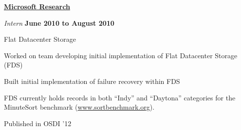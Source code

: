 \bigskip

\href{http://research.microsoft.com}{\textbf{Microsoft Research}}
\begin{outerlist}

\item[] \textit{Intern}
    \hfill \textbf{June 2010 to August 2010}
    \begin{innerlist}
        \item Flat Datacenter Storage
        \begin{innerlist}
           \item Worked on team developing initial implementation of Flat
Datacenter Storage (FDS)
           \item Built initial implementation of failure recovery within
FDS
           \item FDS currently holds records in both ``Indy'' and
``Daytona'' categories for the MinuteSort benchmark
(\href{http://www.sortbenchmark.org}{www.sortbenchmark.org}).
           \item Published in OSDI '12
        \end{innerlist}
     \end{innerlist}
\end{outerlist}
